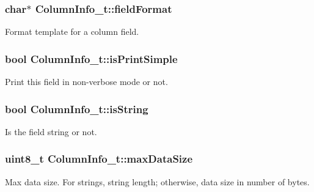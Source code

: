 \subsubsection[{\texorpdfstring{field\+Format}{fieldFormat}}]{\setlength{\rightskip}{0pt plus 5cm}char$\ast$ Column\+Info\+\_\+t\+::field\+Format}\hypertarget{struct_column_info__t_a5d8a42d79af3a6f71d2d0b4b1ef948d2}{}\label{struct_column_info__t_a5d8a42d79af3a6f71d2d0b4b1ef948d2}


Format template for a column field. 

\subsubsection[{\texorpdfstring{is\+Print\+Simple}{isPrintSimple}}]{\setlength{\rightskip}{0pt plus 5cm}bool Column\+Info\+\_\+t\+::is\+Print\+Simple}\hypertarget{struct_column_info__t_ae66c8cdf7404644c2bb483fbc5218583}{}\label{struct_column_info__t_ae66c8cdf7404644c2bb483fbc5218583}


Print this field in non-\/verbose mode or not. 

\subsubsection[{\texorpdfstring{is\+String}{isString}}]{\setlength{\rightskip}{0pt plus 5cm}bool Column\+Info\+\_\+t\+::is\+String}\hypertarget{struct_column_info__t_a6ce44156b2da6153d4b229e1a62e6df2}{}\label{struct_column_info__t_a6ce44156b2da6153d4b229e1a62e6df2}


Is the field string or not. 

\subsubsection[{\texorpdfstring{max\+Data\+Size}{maxDataSize}}]{\setlength{\rightskip}{0pt plus 5cm}uint8\+\_\+t Column\+Info\+\_\+t\+::max\+Data\+Size}\hypertarget{struct_column_info__t_a92291da62cdc37358679c5176213d0f4}{}\label{struct_column_info__t_a92291da62cdc37358679c5176213d0f4}
Max data size. For strings, string length; otherwise, data size in number of bytes. 
